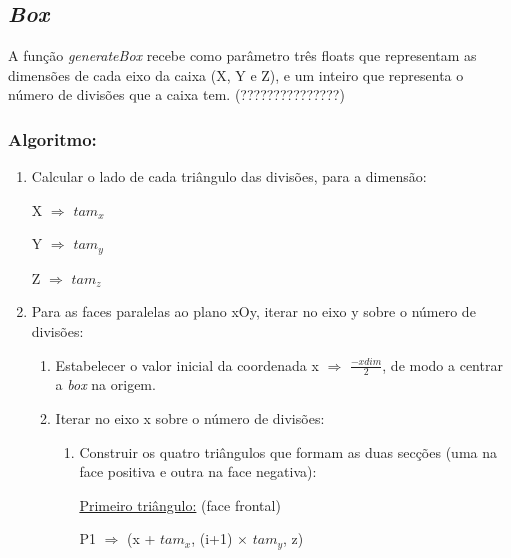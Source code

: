 \documentclass[a4paper]{article}
\begin{document}
\newpage

\subsection{\textit{Box}}
\label{sec:box}
A função \textit{generateBox} recebe como parâmetro três floats que representam as dimensões de cada eixo da caixa (X, Y e Z), e um inteiro que representa o número de divisões que a caixa tem. (???????????????)

\newpage

\subsubsection{Algoritmo:}

\ttfamily
\begin{enumerate}
  \item Calcular o lado de cada triângulo das divisões, para a dimensão:

  \vspace{0.2cm}

  \hspace{5.0cm}X $\Rightarrow$ \underline{$tam_{x}$}

  \hspace{5.0cm}Y $\Rightarrow$ \underline{$tam_{y}$}

  \hspace{5.0cm}Z $\Rightarrow$ \underline{$tam_{z}$}

  \item Para as faces paralelas ao plano xOy, iterar no eixo y sobre o número de divisões:
  \begin{enumerate}
    \item Estabelecer o valor inicial da coordenada x $\Rightarrow$ $\frac{-xdim}{2}$, de modo a centrar a \textit{box} na origem.
    \item Iterar no eixo x sobre o número de divisões:
    \begin{enumerate}
    \item Construir os quatro triângulos que formam as duas secções (uma na face positiva e outra na face negativa):

      \vspace{0.5cm}

      \underline{Primeiro triângulo:} (face frontal)

      \vspace{0.5cm}

          \hspace{0.5cm} P1 $\Rightarrow$ (x + $tam_{x}$, (i+1) $\times$ $tam_{y}$, z)


\end{enumerate}
\end{enumerate}
\end{enumerate}
\end{document}
